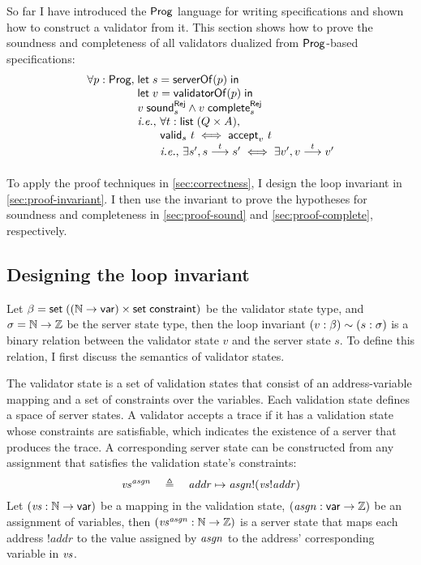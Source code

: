 So far I have introduced the $\mathsf{Prog}$ language for writing specifications and
shown how to construct a validator from it.  This section shows how to prove the
soundness and completeness of all validators dualized from $\mathsf{Prog}$-based
specifications:
\[\begin{array}{r@{\;}l}
\forall p:\Prog,&\letin{s}{\serverOf(p)}\\
&\letin{v}{\validatorOf(p)}\\
&\rejSound v s\wedge\rejComplete v s\\
&\ie\text{, }\forall t:\List(Q\times A),\\
&\qquad\valid s t\iff\accepts v t\\
&\qquad\ie\text{, }\exists s',\behaves s t s'\iff\exists v',\behaves v t v'
\end{array}\]

To apply the proof techniques in \autoref{sec:correctness}, I design the loop
invariant in \autoref{sec:proof-invariant}.  I then use the invariant to prove
the hypotheses for soundness and completeness in \autoref{sec:proof-sound}
and \autoref{sec:proof-complete}, respectively.

\subsection{Designing the loop invariant}
\label{sec:proof-invariant}
Let $\beta=\mathsf{set}\;((\mathbb N\to\mathsf{var})\times\mathsf{set}\;\mathsf{constraint})$ be the validator state
type, and $\sigma=\mathbb N\to\mathbb Z$ be the server state type, then the loop invariant
$(v:\beta)\sim (s:\sigma)$ is a binary relation between the validator
state $v$ and the server state $s$.  To define this relation, I first discuss
the semantics of validator states.

The validator state is a set of validation states that consist of an
address-variable mapping and a set of constraints over the variables.  Each
validation state defines a space of server states.  A validator accepts a trace
if it has a validation state whose constraints are satisfiable, which indicates
the existence of a server that produces the trace.  A corresponding server state
can be constructed from any assignment that satisfies the validation state's
constraints:
\[\mathit{vs}^{\mathit{asgn}}\quad\triangleq\quad \mathit{addr}\mapsto \mathit{asgn}!(\mathit{vs}!\mathit{addr})\]
Let $(\mathit{vs}:\mathbb N\to\mathsf{var})$ be a mapping in the validation state,
$(\mathit{asgn}:\mathsf{var}\to\mathbb Z)$ be an assignment of variables, then
$(\mathit{vs}^{\mathit{asgn}}:\mathbb N\to\mathbb Z)$ is a server state that maps each address
$!\mathit{addr}$ to the value assigned by $\mathit{asgn}$ to the address' corresponding
variable in $\mathit{vs}$.

